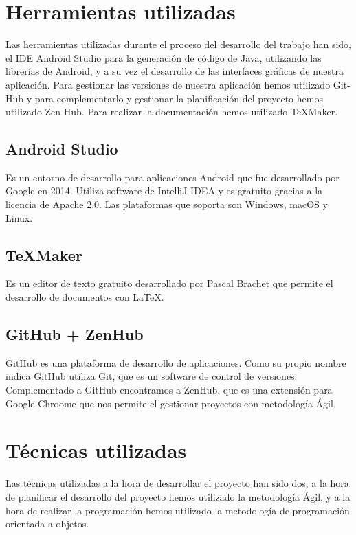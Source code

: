 
\section{Herramientas utilizadas}
Las herramientas utilizadas durante el proceso del desarrollo del trabajo han sido, el IDE Android Studio para la generación de código de Java, utilizando las librerías de Android, y a su vez el desarrollo de las interfaces gráficas de nuestra aplicación.
Para gestionar las versiones de nuestra aplicación hemos utilizado Git-Hub y para complementarlo y gestionar la planificación del proyecto hemos utilizado Zen-Hub.
Para realizar la documentación hemos utilizado \TeX{}Maker.

\subsection{Android Studio}

Es un entorno de desarrollo para aplicaciones Android que fue desarrollado por Google en 2014. Utiliza software de IntelliJ IDEA y es gratuito gracias a la licencia de Apache 2.0.
Las plataformas que soporta son Windows, macOS y Linux.

\subsection{\TeX{}Maker}

Es un editor de texto gratuito desarrollado por Pascal Brachet que permite el desarrollo de documentos con La\TeX{}.

\subsection{GitHub + ZenHub}
GitHub es una plataforma de desarrollo de aplicaciones. Como su propio nombre indica GitHub utiliza Git, que es un software de control de versiones.
Complementado a GitHub encontramos a ZenHub, que es una extensión para Google Chroome que nos permite el gestionar proyectos con metodología Ágil.

\section{Técnicas utilizadas}

Las técnicas utilizadas a la hora de desarrollar el proyecto han sido dos, a la hora de planificar el desarrollo del proyecto hemos utilizado la metodología Ágil, y a la hora de realizar la programación hemos utilizado la metodología de programación orientada a objetos.

